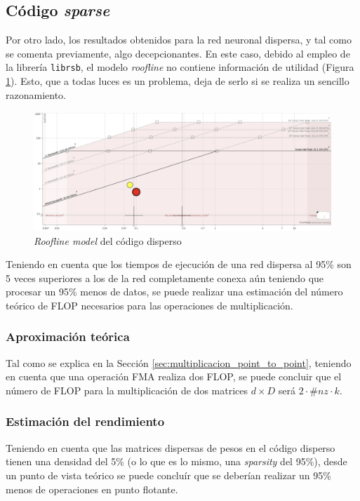 \subsection{Código \textit{sparse}}
Por otro lado, los resultados obtenidos para la red neuronal dispersa, y tal como se comenta previamente, algo decepcionantes. En este caso, debido al empleo de la librería \texttt{librsb}, el modelo \textit{roofline} no contiene información de utilidad (Figura \ref{fig:roofline_sparse_details}). Esto, que a todas luces es un problema, deja de serlo si se realiza un sencillo razonamiento.

\begin{figure}[h!]
    \centering
    \includegraphics[width=\textwidth]{img/rooflines/roofline_sparse.png}
    \caption{\textit{Roofline model} del código disperso}
    \label{fig:roofline_sparse_details}
\end{figure}

Teniendo en cuenta que los tiempos de ejecución de una red dispersa al 95\% son 5 veces superiores a los de la red completamente conexa aún teniendo que procesar un 95\% menos de datos, se puede realizar una estimación del número teórico de FLOP necesarios para las operaciones de multiplicación.

\subsubsection{Aproximación teórica}
Tal como se explica en la Sección \ref{sec:multiplicacion_point_to_point}, teniendo en cuenta que una operación FMA realiza dos FLOP, se puede concluir que el número de FLOP para la multiplicación de dos matrices $d\times D$ será $2 \cdot \#nz \cdot k$.

\subsubsection{Estimación del rendimiento}
Teniendo en cuenta que las matrices dispersas de pesos en el código disperso tienen una densidad del 5\% (o lo que es lo mismo, una \textit{sparsity} del 95\%), desde un punto de vista teórico se puede concluír que se deberían realizar un 95\% menos de operaciones en punto flotante.

